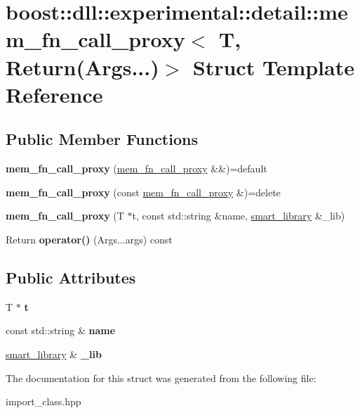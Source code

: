 \hypertarget{a00218}{}\section{boost\+:\+:dll\+:\+:experimental\+:\+:detail\+:\+:mem\+\_\+fn\+\_\+call\+\_\+proxy$<$ T, Return(Args...)$>$ Struct Template Reference}
\label{a00218}
\subsection*{Public Member Functions}
\begin{DoxyCompactItemize}
\item 
{\bfseries mem\+\_\+fn\+\_\+call\+\_\+proxy} (\hyperlink{a00216}{mem\+\_\+fn\+\_\+call\+\_\+proxy} \&\&)=default\hypertarget{a00218_a529332d1b9614643dd31697e74fab161}{}\label{a00218_a529332d1b9614643dd31697e74fab161}

\item 
{\bfseries mem\+\_\+fn\+\_\+call\+\_\+proxy} (const \hyperlink{a00216}{mem\+\_\+fn\+\_\+call\+\_\+proxy} \&)=delete\hypertarget{a00218_a85975dbd8e6fbe357161a5d88267a867}{}\label{a00218_a85975dbd8e6fbe357161a5d88267a867}

\item 
{\bfseries mem\+\_\+fn\+\_\+call\+\_\+proxy} (T $\ast$t, const std\+::string \&name, \hyperlink{a00281}{smart\+\_\+library} \&\+\_\+lib)\hypertarget{a00218_a92aad9def8ffeff646826e158a4acf11}{}\label{a00218_a92aad9def8ffeff646826e158a4acf11}

\item 
Return {\bfseries operator()} (Args...\+args) const \hypertarget{a00218_a7057c1faa4ac9dec7bc05fbab30eaf47}{}\label{a00218_a7057c1faa4ac9dec7bc05fbab30eaf47}

\end{DoxyCompactItemize}
\subsection*{Public Attributes}
\begin{DoxyCompactItemize}
\item 
T $\ast$ {\bfseries t}\hypertarget{a00218_a4484ec7a0868324504800d21488602b7}{}\label{a00218_a4484ec7a0868324504800d21488602b7}

\item 
const std\+::string \& {\bfseries name}\hypertarget{a00218_ab3fa621f0a26c80ddaecf902ce9d2bca}{}\label{a00218_ab3fa621f0a26c80ddaecf902ce9d2bca}

\item 
\hyperlink{a00281}{smart\+\_\+library} \& {\bfseries \+\_\+lib}\hypertarget{a00218_ac408eec8d4c534affe8584a1c043aaf5}{}\label{a00218_ac408eec8d4c534affe8584a1c043aaf5}

\end{DoxyCompactItemize}


The documentation for this struct was generated from the following file\+:\begin{DoxyCompactItemize}
\item 
import\+\_\+class.\+hpp\end{DoxyCompactItemize}
